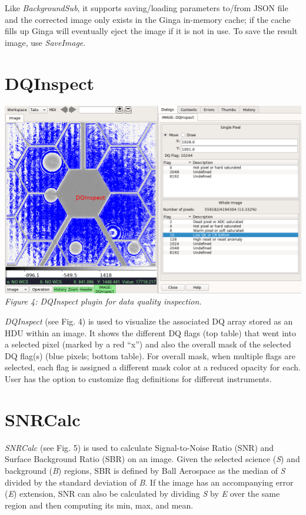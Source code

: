 \documentclass[]{article}
\begin{document}
\begin{multicols}{3}
\para
Like {\em BackgroundSub}, it supports saving/loading parameters to/from
JSON file and the corrected image only exists in the Ginga in-memory cache;
if the cache fills up Ginga will eventually eject the image if it is not
in use.  To save the result image, use {\em SaveImage}.

\section*{DQInspect}

\begin{center}
\includegraphics[width=8in]{plugin_dqinspect} \\
\vspace*{0.4em}
\label{fig:plugin_dqinspect}
{\small\em Figure 4: DQInspect plugin for data quality inspection.}
\end{center}

\para
{\em DQInspect} (see Fig. 4) is used to visualize the associated DQ
array stored as an HDU within an image.
It shows the different DQ flags (top table) that went into a selected pixel
(marked by a red ``x'')
and also the overall mask of the selected DQ flag(s)
(blue pixels; bottom table).
For overall mask, when multiple flags are selected, each flag is assigned a
different mask color at a reduced opacity for each.
User has the option to customize flag definitions for different instruments.

\section*{SNRCalc}

{\em SNRCalc} (see Fig. 5) is used to calculate Signal-to-Noise Ratio
(SNR) and Surface Background Ratio (SBR) on an image.
Given the selected science ({\em S}) and background ({\em B}) regions,
SBR is defined by Ball Aerospace\cite{sbr} as the median of {\em S}
divided by the standard deviation of {\em B}.
If the image has an accompanying error ({\em E}) extension, SNR can also
be calculated by dividing {\em S} by {\em E} over the same region and
then computing its min, max, and mean.


\end{multicols}
\end{document}
